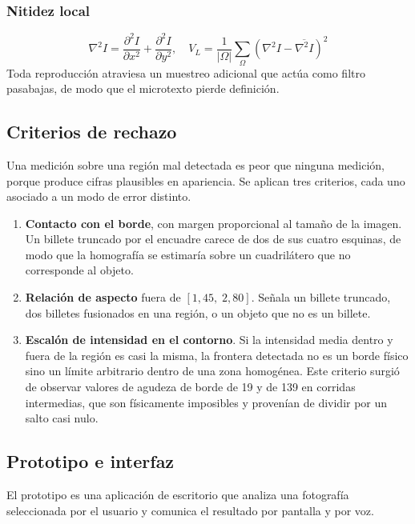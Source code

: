 \documentclass[conference]{IEEEtran}
\begin{document}
\subsubsection{Nitidez local}
\begin{equation}
\nabla^2 I = \frac{\partial^2I}{\partial x^2}+\frac{\partial^2I}{\partial y^2},
\quad
V_L = \frac{1}{|\Omega|}\sum_{\Omega}\left(\nabla^2I-\overline{\nabla^2I}\right)^2
\end{equation}
Toda reproducción atraviesa un muestreo adicional que actúa como filtro
pasabajas, de modo que el microtexto pierde definición.

\subsection{Criterios de rechazo}
\label{sec:rechazo}

Una medición sobre una región mal detectada es peor que ninguna
medición, porque produce cifras plausibles en apariencia. Se aplican
tres criterios, cada uno asociado a un modo de error distinto.

\begin{enumerate}
\item \textbf{Contacto con el borde}, con margen proporcional al tamaño
      de la imagen. Un billete truncado por el encuadre carece de dos
      de sus cuatro esquinas, de modo que la homografía se estimaría
      sobre un cuadrilátero que no corresponde al objeto.
\item \textbf{Relación de aspecto} fuera de $[1{,}45,\;2{,}80]$. Señala
      un billete truncado, dos billetes fusionados en una región, o un
      objeto que no es un billete.
\item \textbf{Escalón de intensidad en el contorno}. Si la intensidad
      media dentro y fuera de la región es casi la misma, la frontera
      detectada no es un borde físico sino un límite arbitrario dentro
      de una zona homogénea. Este criterio surgió de observar valores
      de agudeza de borde de 19 y de 139 en corridas intermedias, que
      son físicamente imposibles y provenían de dividir por un salto
      casi nulo.
\end{enumerate}

\subsection{Prototipo e interfaz}

El prototipo es una aplicación de escritorio que analiza una fotografía
seleccionada por el usuario y comunica el resultado por pantalla y por
voz.
\end{document}
